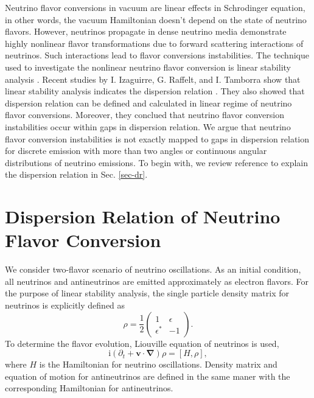 \documentclass[%
preprint,
 amsmath,amssymb,
 aps,
 prd
]{revtex4-1}
\newcommand{\ii}{\mathrm i}
\begin{document}
Neutrino flavor conversions in vacuum are linear effects in Schrodinger equation, in other words, the vacuum Hamiltonian doesn't depend on the state of neutrino flavors. However, neutrinos propagate in dense neutrino media demonstrate highly nonlinear flavor transformations due to forward scattering interactions of neutrinos. Such interactions lead to flavor conversions instabilities. The technique used to investigate the nonlinear neutrino flavor conversion is linear stability analysis \cite{Banerjee2011a,Raffelt2013}. Recent studies by I. Izaguirre, G. Raffelt, and I. Tamborra show that linear stability analysis indicates the dispersion relation \cite{Izaguirre2016a}. They also showed that dispersion relation can be defined and calculated in linear regime of neutrino flavor conversions. Moreover, they conclued that neutrino flavor conversion instabilities occur within gaps in dispersion relation. We argue that neutrino flavor conversion instabilities is not exactly mapped to gaps in dispersion relation for discrete emission with more than two angles or continuous angular distributions of neutrino emissions. To begin with, we review reference  to explain the dispersion relation in Sec. \ref{sec-dr}.



\section{\label{sec-dr}Dispersion Relation of Neutrino Flavor Conversion}

We consider two-flavor scenario of neutrino oscillations. As an initial condition, all neutrinos and antineutrinos are emitted approximately as electron flavors. For the purpose of linear stability analysis, the single particle density matrix for neutrinos is explicitly defined as
\begin{equation}
   \rho = \frac{1}{2} \begin{pmatrix}
   1 & \epsilon \\
   \epsilon^* & -1
\end{pmatrix}.
\end{equation}
To determine the flavor evolution, Liouville equation of neutrinos is used,
\begin{equation}
\ii (\partial_t + \mathbf v\cdot \mathbf{\nabla}) \rho = \left[ H, \rho \right],
\label{eqn-liouville-eqn}
\end{equation}
where $H$ is the Hamiltonian for neutrino oscillations. Density matrix and equation of motion for antineutrinos are defined in the same maner with the corresponding Hamiltonian for antineutrinos.
\end{document}
